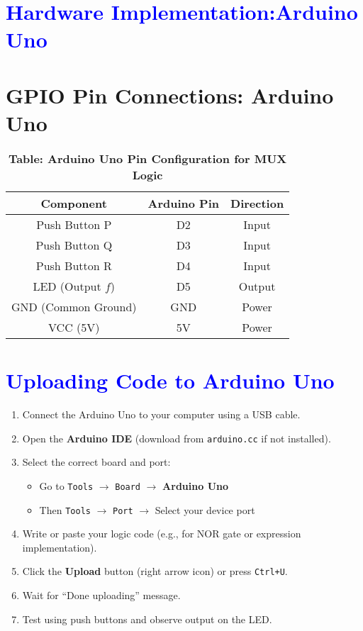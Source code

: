 \documentclass[twocolumn]{article}
\begin{document}
\section*{\textcolor{blue}{Hardware Implementation:Arduino Uno}}

\section*{GPIO Pin Connections: Arduino Uno}

\begin{table}[h]
\centering
\renewcommand{\arraystretch}{1.2}
\begin{tabular}{|c|c|c|}
\hline
\textbf{Component} & \textbf{Arduino Pin} & \textbf{Direction} \\
\hline
Push Button P & D2 & Input \\
Push Button Q & D3 & Input \\
Push Button R & D4 & Input \\
LED (Output $f$) & D5 & Output \\
GND (Common Ground) & GND & Power \\
VCC (5V) & 5V & Power \\
\hline
\end{tabular}
\caption*{\textbf{Table: Arduino Uno Pin Configuration for MUX Logic}}
\end{table}

\section*{\textcolor{blue}{Uploading Code to Arduino Uno}}

\begin{enumerate}
    \item Connect the Arduino Uno to your computer using a USB cable.
    \item Open the \textbf{Arduino IDE} (download from \texttt{arduino.cc} if not installed).
    \item Select the correct board and port:
    \begin{itemize}
        \item Go to \texttt{Tools} $\rightarrow$ \texttt{Board} $\rightarrow$ \textbf{Arduino Uno}
        \item Then \texttt{Tools} $\rightarrow$ \texttt{Port} $\rightarrow$ Select your device port
    \end{itemize}
    \item Write or paste your logic code (e.g., for NOR gate or expression implementation).
    \item Click the \textbf{Upload} button (right arrow icon) or press \texttt{Ctrl+U}.
    \item Wait for “Done uploading” message.
    \item Test using push buttons and observe output on the LED.
\end{enumerate}
\end{document}
